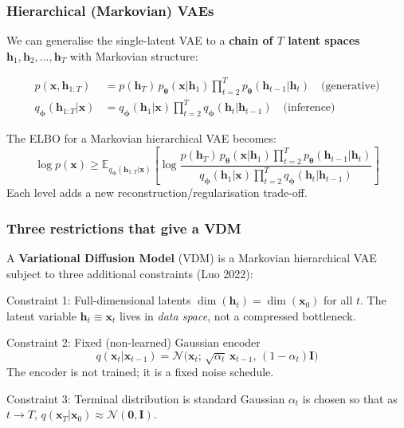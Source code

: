 \documentclass{beamer}
\newcommand{\E}{\mathbb{E}}
\newcommand{\Norm}{\mathcal{N}}
\begin{document}
\begin{frame}
\frametitle{Hierarchical (Markovian) VAEs}

We can generalise the single-latent VAE to a \textbf{chain of $T$ latent spaces}
$\bm{h}_1, \bm{h}_2,\ldots,\bm{h}_T$ with Markovian structure:

\begin{align*}
p(\bm{x}, \bm{h}_{1:T})
  &= p(\bm{h}_T)\,p_{\bm{\theta}}(\bm{x}|\bm{h}_1)
     \prod_{t=2}^{T}p_{\bm{\theta}}(\bm{h}_{t-1}|\bm{h}_t)
     \quad\text{(generative)}\\[4pt]
q_{\bm{\phi}}(\bm{h}_{1:T}|\bm{x})
  &= q_{\bm{\phi}}(\bm{h}_1|\bm{x})
     \prod_{t=2}^{T}q_{\bm{\phi}}(\bm{h}_t|\bm{h}_{t-1})
     \quad\text{(inference)}
\end{align*}

The ELBO for a Markovian hierarchical VAE becomes:
\[
\log p(\bm{x})
\geq
\E_{q_{\bm{\phi}}(\bm{h}_{1:T}|\bm{x})}
\!\left[\log\frac{p(\bm{h}_T)\,p_{\bm{\theta}}(\bm{x}|\bm{h}_1)
    \prod_{t=2}^{T}p_{\bm{\theta}}(\bm{h}_{t-1}|\bm{h}_t)}
  {q_{\bm{\phi}}(\bm{h}_1|\bm{x})\prod_{t=2}^{T}
    q_{\bm{\phi}}(\bm{h}_t|\bm{h}_{t-1})}\right]
\]
Each level adds a new reconstruction/regularisation trade-off.
\end{frame}

\begin{frame}
\frametitle{Three restrictions that give a VDM}

A \textbf{Variational Diffusion Model} (VDM) is a Markovian hierarchical VAE
subject to three additional constraints (Luo 2022):

\begin{block}{Constraint 1: Full-dimensional latents}
$\dim(\bm{h}_t) = \dim(\bm{x}_0)$ for all $t$.
The latent variable $\bm{h}_t \equiv \bm{x}_t$ lives in \emph{data space}, not a
compressed bottleneck.
\end{block}

\begin{block}{Constraint 2: Fixed (non-learned) Gaussian encoder}
\[
q(\bm{x}_t|\bm{x}_{t-1})
= \Norm\!\bigl(\bm{x}_t;\,\sqrt{\alpha_t}\,\bm{x}_{t-1},\,(1-\alpha_t)\mathbf{I}\bigr)
\]
The encoder is not trained; it is a fixed noise schedule.
\end{block}

\begin{block}{Constraint 3: Terminal distribution is standard Gaussian}
$\alpha_t$ is chosen so that as $t\to T$,
$q(\bm{x}_T|\bm{x}_0)\approx\Norm(\bm{0},\mathbf{I})$.
\end{block}
\end{frame}
\end{document}
